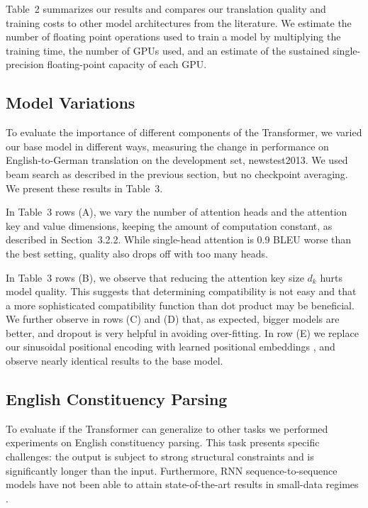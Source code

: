 Table~2 summarizes our results and compares our translation quality and training
costs to other model architectures from the literature. We estimate the number
of floating point operations used to train a model by multiplying the training
time, the number of GPUs used, and an estimate of the sustained single-precision
floating-point capacity of each GPU.

\subsection{Model Variations}

To evaluate the importance of different components of the Transformer, we varied
our base model in different ways, measuring the change in performance on
English-to-German translation on the development set, newstest2013. We used beam
search as described in the previous section, but no checkpoint averaging. We
present these results in Table~3.

In Table~3 rows (A), we vary the number of attention heads and the attention key
and value dimensions, keeping the amount of computation constant, as described
in Section~3.2.2. While single-head attention is 0.9 BLEU worse than the best
setting, quality also drops off with too many heads.

In Table~3 rows (B), we observe that reducing the attention key size $d_k$ hurts
model quality. This suggests that determining compatibility is not easy and that
a more sophisticated compatibility function than dot product may be beneficial.
We further observe in rows (C) and (D) that, as expected, bigger models are
better, and dropout is very helpful in avoiding over-fitting. In row (E) we
replace our sinusoidal positional encoding with learned positional embeddings
\cite{gehring2017convolutional}, and observe nearly identical results to the
base model.

\subsection{English Constituency Parsing}

To evaluate if the Transformer can generalize to other tasks we performed
experiments on English constituency parsing. This task presents specific
challenges: the output is subject to strong structural constraints and is
significantly longer than the input. Furthermore, RNN sequence-to-sequence
models have not been able to attain state-of-the-art results in small-data
regimes \cite{vinyals2015grammar}.

